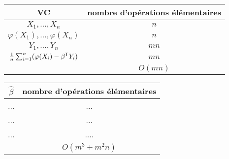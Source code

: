 	\begin{tabular}{cc}
	VC & nombre d'opérations élémentaires \\
	\hline
	$X_1,\ldots,X_n$ & $n$ \\
	$\varphi(X_1),\ldots,\varphi(X_n)$ & $n$ \\
	$Y_1,\ldots,Y_n$ & $mn$ \\
	$\frac{1}{n} \sum_{i = 1}^n (\varphi(X_i) - \beta^\mathsf{T} Y_i)$ & $mn$ \\
	 & $O(mn)$\\
	\end{tabular}
	
	\begin{tabular}{cc}
	$\hat{\beta}$ & nombre d'opérations élémentaires \\
	\hline
	... & ... \\
	... & ... \\
	... & .... \\
	& $O(m^3 + m^2n)$\\
	\end{tabular}